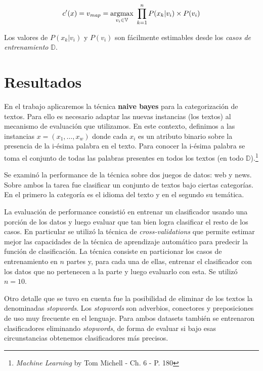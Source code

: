 \documentclass[a4paper,10pt]{article}
\begin{document}
\begin{equation}
  c'(x) = v_{\text{\emph{map}}} = \underset{v_i \in \mathbb{V}}{\text{argmax}}\ \prod^{n}_{k=1} P(x_k | v_i) \times P(v_i)
\end{equation}

Los valores de $P(x_k | v_i)$ y $P(v_i)$ son fácilmente estimables desde los \emph{casos de entrenamiento} $\mathbb{D}$.

\section{Resultados}

En el trabajo aplicaremos la técnica \textbf{naive bayes} para la categorización de textos. Para ello es necesario adaptar las nuevas instancias (los textos) al mecanismo de evaluación que utilizamos. En este contexto, definimos a las instancias $x = (x_1, \dots, x_w)$ donde cada $x_i$ es un atributo binario sobre la presencia de la i-ésima palabra en el texto. Para conocer la i-ésima palabra se toma el conjunto de todas las palabras presentes en todos los textos (en todo $\mathbb{D}$).\footnote{\emph{Machine Learning} by Tom Michell - Ch. 6 - P. 180}

Se examinó la performance de la técnica sobre dos juegos de datos: \textsf{web} y \textsf{news}. Sobre ambos la tarea fue clasificar un conjunto de textos bajo ciertas categorías. En el primero la categoría es el idioma del texto y en el segundo su temática. 

La evaluación de performance consistió en entrenar un clasificador usando una porción de los datos y luego evaluar que tan bien logra clasificar el resto de los casos. En particular se utilizó la técnica de \emph{cross-validations} que permite estimar mejor las capacidades de la técnica de aprendizaje automático para predecir la función de clasificación. La técnica consiste en particionar los casos de entrenamiento en $n$ partes y, para cada una de ellas, entrenar el clasificador con los datos que no pertenecen a la parte y luego evaluarlo con esta. Se utilizó $n = 10$.

Otro detalle que se tuvo en cuenta fue la posibilidad de eliminar de los textos la denominadas \emph{stopwords}. Los \emph{stopwords} son adverbios, conectores y preposiciones de uso muy frecuente en el lenguaje. Para ambos datasets también se entrenaron clasificadores eliminando \emph{stopwords}, de forma de evaluar si bajo esas circunstancias obtenemos clasificadores más precisos.
\end{document}
